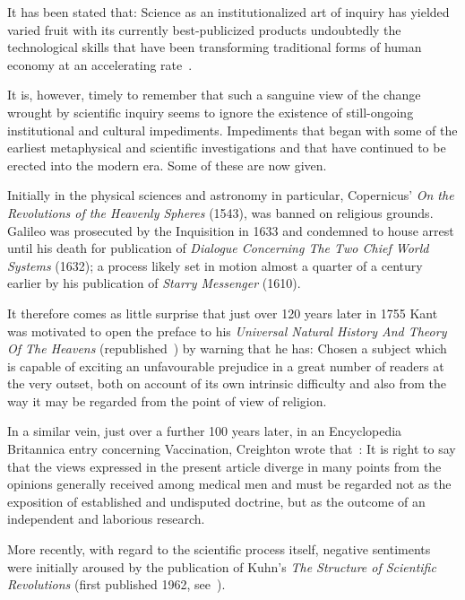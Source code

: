 \documentclass[10pt,letterpaper]{article}
\begin{document}
It has been stated that: Science as an institutionalized art of inquiry has yielded varied fruit with its currently best-publicized products undoubtedly the technological skills that have been transforming traditional forms of human economy at an accelerating rate~\cite{nagel61}.

It is, however, timely to remember that such a sanguine view of the change wrought by scientific inquiry seems to ignore the existence of still-ongoing  institutional and cultural impediments. Impediments that began with some of the earliest metaphysical and scientific investigations and that have continued to be erected into the modern era. Some of these are now given.

Initially in the physical sciences and astronomy in particular, Copernicus' {\it{On the Revolutions of the Heavenly Spheres}} (1543), was banned on religious grounds. Galileo was prosecuted by the Inquisition in 1633 and condemned to house arrest until his death for publication of {\it{Dialogue Concerning The Two Chief World Systems}} (1632); a process likely set in motion almost a quarter of a century earlier by his publication of {\it{Starry Messenger}} (1610).

It therefore comes as little surprise that just over 120 years later in 1755 Kant~\cite{kant08} was motivated to open the preface to his {\it{Universal Natural History And Theory Of The Heavens}} (republished~\cite{kant08}) by warning that he has: Chosen a subject which is capable of exciting an unfavourable prejudice in a great number of readers at the very outset, both on account of its own intrinsic difficulty and also from the way it may be regarded from the point of view of religion.
 
In a similar vein, just over a further 100 years later, in an Encyclopedia Britannica entry concerning Vaccination, Creighton wrote that~\cite{creighton88}: It is right to say that the views expressed in the present article diverge in many points from the opinions generally received among medical men and must be regarded not as the exposition of established and undisputed doctrine, but as the outcome of an independent and laborious research.

More recently, with regard to the scientific process itself, negative sentiments were initially aroused by the publication of Kuhn's {\it The Structure of Scientific Revolutions} (first published 1962, see~\cite{bird22}).
\end{document}

